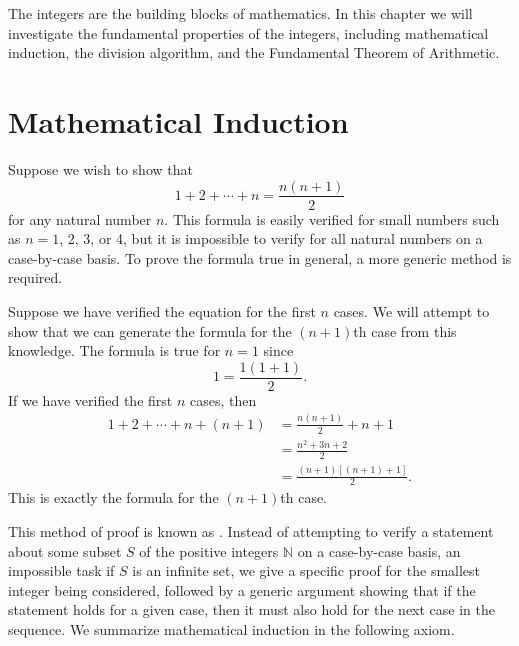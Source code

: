 

 
 
The integers are the building blocks of mathematics. In this chapter we will investigate  the fundamental properties of the integers, including mathematical induction, the division algorithm, and the Fundamental Theorem of Arithmetic.


\section{Mathematical Induction}\label{integers:math_induction}

Suppose we wish to show that
\[
1 + 2 + \cdots + n = \frac{n(n + 1)}{2}
\]
for any natural number $n$. This formula is easily  verified for small numbers such as $n = 1$, 2, 3, or 4, but it is impossible to verify for all natural numbers on a case-by-case basis.  To prove the formula true in general, a more generic method is required.

Suppose we have verified the equation for the first $n$ cases.  We will attempt to show that we can generate the formula for the $(n + 1)$th case from this knowledge.  The formula is true for $n = 1$ since 
\[
1 = \frac{1(1 + 1)}{2}.
\]
If we have verified the first $n$ cases, then
\begin{align*}
1 + 2 + \cdots + n + (n + 1) & = \frac{n(n + 1)}{2} + n + 1 \\
& = \frac{n^2 + 3n + 2}{2} \\
& = \frac{(n + 1)[(n + 1) + 1]}{2}.
\end{align*}
This is exactly the formula for the $(n + 1)$th case.
 
This method of proof is known as .  Instead of attempting to verify a statement about some subset $S$ of the positive integers ${\mathbb N}$ on a case-by-case basis, an impossible task if $S$ is an infinite set, we give a specific proof for the smallest integer being considered, followed by a generic argument showing that if the statement holds for a given case, then it must also hold for the next  case in the sequence.  We summarize mathematical induction in the following axiom. 

\medskip

